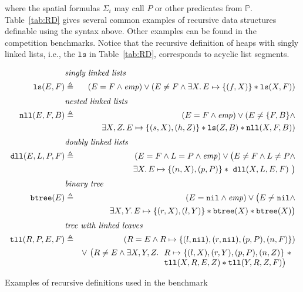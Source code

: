 \documentclass[twoside,11pt]{article}
\newcommand{\sep}{.\,}
\newcommand{\posep}{*}
\newcommand{\points}{\mapsto}
\newcommand{\preds}{\mathbb{P}}
\newcommand{\nil}{\mathtt{nil}}
\newcommand{\ls}{\mathtt{ls}}
\newcommand{\dll}{\mathtt{dll}}
\newcommand{\nll}{\mathtt{nll}}
\begin{document}
\noindent where the spatial formulas $\Sigma_i$ may call $P$ or other predicates from $\preds$.
Table~\ref{tab:RD} gives several common examples of recursive data structures definable using the syntax above. Other examples can be found in the competition benchmarks.
%
Notice that the recursive definition of heaps with singly linked lists, i.e., the $\ls$ in Table~\ref{tab:RD},
corresponds to acyclic list segments.


\begin{table}
\begin{eqnarray}
%
\lefteqn{\textit{singly linked lists}} \nonumber \\
\ls(E,F) & \triangleq & (E=F\land\mathit{emp}) \lor (E\neq F \land 
\exists X\sep E\points\{(f,X)\}\posep \ls(X,F)) 
\\[1mm]
%  
\lefteqn{\textit{nested linked lists}} \nonumber \\ 
\nll(E,F,B) & \triangleq & (E=F\land\mathit{emp}) \lor (E\neq \{F,B\} \land \\
&& \exists X,Z\sep E\points\{(s,X),(h,Z)\}\posep \ls(Z,B) \posep\nll(X,F,B)) \nonumber
\\[1mm]
%  
\lefteqn{\textit{doubly linked lists}} \nonumber \\ 
\dll(E, L, P, F) & \triangleq & (E=F\land L=P\land \mathit{emp}) \lor \big( E\neq F \land L\neq P \land \\
&& \exists X\sep E\points \{(n,X),(p,P)\} \posep\ \dll(X,L,E,F)\ \big)\nonumber
\\[1mm]
%  
\lefteqn{\textit{binary tree}} \nonumber \\ 
\mathtt{btree}(E) & \triangleq & (E=\nil\land \mathit{emp}) \lor \big( E\neq \nil \land 
\\
&& \exists X,Y\sep E\points \{(r,X),(l,Y)\} \posep \mathtt{btree}(X) \posep \mathtt{btree}(X)\big)
\nonumber 
\\[1mm]
%  
\lefteqn{\textit{tree with linked leaves}} \nonumber \\ 
\mathtt{tll}(R,P,E,F) & \triangleq & (R=E \land R\points \{(l,\nil),(r,\nil),(p,P),(n,F)\}) \\
&& \lor~\big( R\neq E \land \exists X,Y,Z\sep 
\begin{array}[t]{l}
R\points \{(l,X),(r,Y),(p,P),(n,Z)\} \ \posep \\
\mathtt{tll}(X,R,E,Z) \posep \mathtt{tll}(Y,R,Z,F)\big)
\end{array} \nonumber  
\end{eqnarray}

\caption{Examples of recursive definitions used in the benchmark}
\label{tab:RD}

\end{table}
\end{document}
